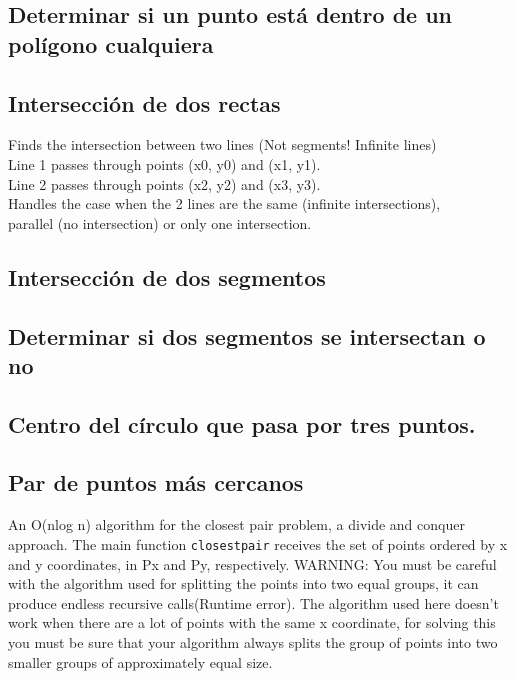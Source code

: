 \documentclass[10pt,letterpaper,twocolumn,twosided]{article}
\newcommand{\codigofuente}[1]{

\dotfill
}
\begin{document}
\subsection{Determinar si un punto está dentro de un polígono cualquiera}

\codigofuente{src/geom/pointInAnyKindOfPolygon.cpp}

\subsection{Intersección de dos rectas}
Finds the intersection between two lines (Not segments! Infinite lines)\\
Line 1 passes through points (x0, y0) and (x1, y1).\\
Line 2 passes through points (x2, y2) and (x3, y3).\\
Handles the case when the 2 lines are the same (infinite intersections),\\
parallel (no intersection) or only one intersection.\\

\codigofuente{src/geom/intersectardosrectas.cpp}

\subsection{Intersección de dos segmentos}

\codigofuente{src/geom/inter_dos_segmentos.cpp}

\subsection{Determinar si dos segmentos se intersectan o no}

\codigofuente{src/geom/inter_dos_segmentos_si_no.cpp}

\subsection{Centro del círculo que pasa por tres puntos.}

\codigofuente{src/geom/centro_circulo_ters_puntos.cpp}

\subsection{Par de puntos más cercanos} 

An O(nlog n) algorithm for the closest pair problem, a divide and conquer approach. The main function \verb+closestpair+ receives the set of points ordered by x and y coordinates, in Px and Py, respectively.
WARNING: You must be careful with the algorithm used for splitting the points into two equal groups, it can produce endless recursive calls(Runtime error). The algorithm used here doesn't work when there are a lot of points with the same x coordinate, for solving this you must be sure that your algorithm always splits the group of points into two smaller groups of approximately equal size. 
 
\end{document}
